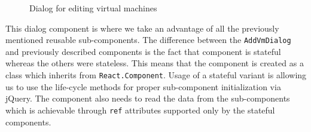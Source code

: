 \begin{figure}[h]
\caption{Dialog for editing virtual machines}
\label{editVMDialog}
\end{figure}

 
This dialog component is where we take an advantage of all the previously mentioned reusable sub-components. The difference between the \texttt{AddVmDialog} and previously described components is the fact that component is stateful whereas the others were stateless. This means that the component is created as a class which inherits from \texttt{React.Component}. Usage of a stateful variant is allowing us to use the life-cycle methods for proper sub-component initialization via jQuery. The component also needs to read the data from the sub-components which is achievable through \texttt{ref} attributes supported only by the stateful components.

